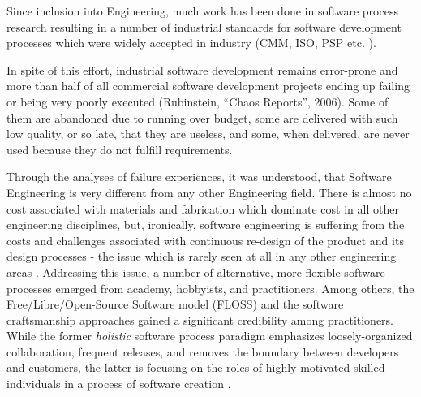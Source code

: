 Since inclusion into Engineering, much work has been done in software process research 
resulting in a number of industrial standards for software development processes which were 
widely accepted in industry (CMM, ISO, PSP etc. \cite{citeulike:5043104}). 

In spite of this effort, industrial software development remains error-prone and more than half of all 
commercial software development projects ending up failing or being very poorly executed 
(Rubinstein, ``Chaos Reports'', 2006). Some of them are abandoned due to running over budget, 
some are delivered with such low quality, or so late, that they are useless, and some, 
when delivered, are never used because they do not fulfill requirements. 

Through the analyses of failure experiences, it was understood, that Software Engineering is
very different from any other Engineering field. There is almost no cost associated with materials 
and fabrication which dominate cost in all other engineering disciplines, but, ironically, 
software engineering is suffering from the costs and challenges associated with continuous 
re-design of the product and its design processes - the issue which is rarely seen at all 
in any other engineering areas \cite{citeulike:5203446}. Addressing this issue, a number of 
alternative, more flexible software processes emerged from academy, hobbyists, and practitioners. 
Among others, the Free/Libre/Open-Source Software model (FLOSS) and the software craftsmanship  
approaches gained a significant credibility among practitioners. 
While the former \textit{holistic} software process paradigm emphasizes loosely-organized collaboration, 
frequent releases, and removes the boundary between developers and customers, 
the latter is focusing on the roles of highly motivated skilled individuals in a process of software 
creation \cite{citeulike:262020} \cite{citeulike:2759198}. 


